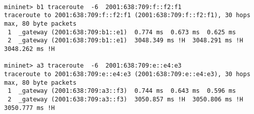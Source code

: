 \documentclass[a4paper]{article}
\begin{document}
\begin{verbatim}

mininet> b1 traceroute  -6  2001:638:709:f::f2:f1
traceroute to 2001:638:709:f::f2:f1 (2001:638:709:f::f2:f1), 30 hops max, 80 byte packets
 1  _gateway (2001:638:709:b1::e1)  0.774 ms  0.673 ms  0.625 ms
 2  _gateway (2001:638:709:b1::e1)  3048.349 ms !H  3048.291 ms !H  3048.262 ms !H
 
mininet> a3 traceroute  -6  2001:638:709:e::e4:e3
traceroute to 2001:638:709:e::e4:e3 (2001:638:709:e::e4:e3), 30 hops max, 80 byte packets
 1  _gateway (2001:638:709:a3::f3)  0.744 ms  0.643 ms  0.596 ms
 2  _gateway (2001:638:709:a3::f3)  3050.857 ms !H  3050.806 ms !H  3050.777 ms !H

\end{verbatim}
\end{document}
